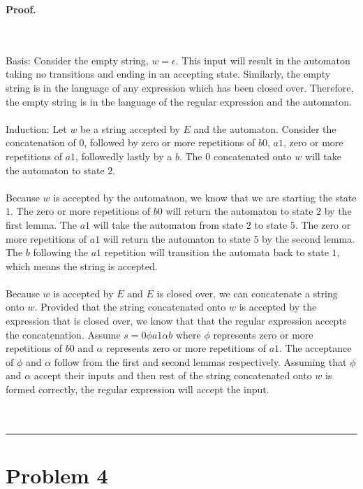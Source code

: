 \documentclass{article}%
\newenvironment{proof}[1][Proof]{\noindent\textbf{#1.} }{\ \rule{0.5em}{0.5em}}
\begin{document}
\begin{proof}
\begin{center}
\begin{tikzpicture}[scale=0.2]
        \end{tikzpicture}
    \end{center}\\
    \\
    Basis: Consider the empty string, $w=\epsilon$. This input will result in the automaton taking no transitions
    and ending in an accepting state. Similarly, the empty string is in the language of any expression which has
    been closed over. Therefore, the empty string is in the language of the regular expression and the automaton.\\
    \\
    Induction: Let $w$ be a string accepted by $E$ and the automaton. Consider the concatenation of $0$, followed by
    zero or more repetitions of $b0$, $a1$, zero or more repetitions of $a1$, followedly lastly by a $b$. The $0$
    concatenated onto $w$ will take the automaton to state $2$.\\
    \\
    Because $w$ is accepted by the automataon, we know that we are starting the state $1$. The zero or more repetitions
    of $b0$ will return the automaton to state $2$ by the first lemma. The $a1$ will take the automaton from state $2$
    to state $5$. The zero or more repetitions of $a1$ will return the automaton to state $5$ by the second lemma. The
    $b$ following the $a1$ repetition will transition the automata back to state $1$, which means the string is accepted.\\
    \\
    Because $w$ is accepted by $E$ and $E$ is closed over, we can concatenate a string onto $w$. Provided that the string
    concatenated onto $w$ is accepted by the expression that is closed over, we know that that the regular expression accepts
    the concatenation. Assume $s=0 \phi a1 \alpha b$ where $\phi$ represents zero or more repetitions of $b0$ and $\alpha$
    represents zero or more repetitions of $a1$. The acceptance of $\phi$ and $\alpha$ follow from the first and second
    lemmas respectively. Assuming that $\phi$ and $\alpha$ accept their inputs and then rest of the string concatenated onto
    $w$ is formed correctly, the regular expression will accept the input.\\
    \\
\end{proof}

\section{Problem 4}
\end{document}
